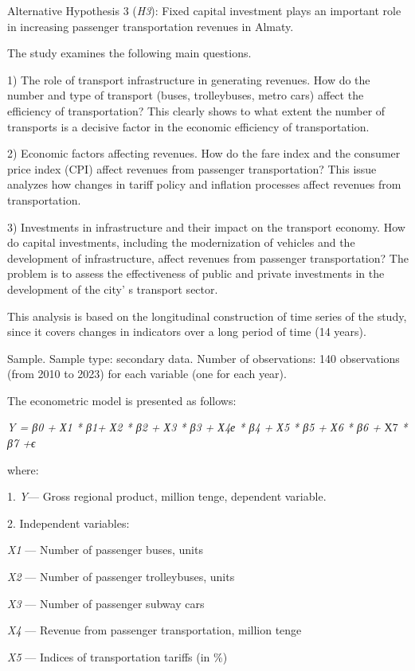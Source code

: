 \begin{multicols}{2}
Alternative Hypothesis 3 (\emph{H3}): Fixed capital investment plays an
important role in increasing passenger transportation revenues in
Almaty.

The study examines the following main questions.

1) The role of transport infrastructure in generating revenues. How do
the number and type of transport (buses, trolleybuses, metro cars)
affect the efficiency of transportation? This clearly shows to what
extent the number of transports is a decisive factor in the economic
efficiency of transportation.

2) Economic factors affecting revenues. How do the fare index and the
consumer price index (CPI) affect revenues from passenger
transportation? This issue analyzes how changes in tariff policy and
inflation processes affect revenues from transportation.

3) Investments in infrastructure and their impact on the transport
economy. How do capital investments, including the modernization of
vehicles and the development of infrastructure, affect revenues from
passenger transportation? The problem is to assess the effectiveness of
public and private investments in the development of the
city' s transport sector.

This analysis is based on the longitudinal construction of time series
of the study, since it covers changes in indicators over a long period
of time (14 years).

Sample. Sample type: secondary data. Number of observations: 140
observations (from 2010 to 2023) for each variable (one for each year).

The econometric model is presented as follows:

\emph{Y = β0 + Х1 * β1+ Х2 * β2 + Х3 * β3 + Х4е * β4 + Х5 * β5 + Х6 * β6
+} Х7 \emph{* β7 +ϵ}

where:

1. \emph{Y}--- Gross regional product, million tenge, dependent
variable.

2. Independent variables:

\emph{X1} --- Number of passenger buses, units

\emph{X2} --- Number of passenger trolleybuses, units

\emph{X3} --- Number of passenger subway cars

\emph{X4} --- Revenue from passenger transportation, million tenge

\emph{X5} --- Indices of transportation tariffs (in \%)


\end{multicols}
